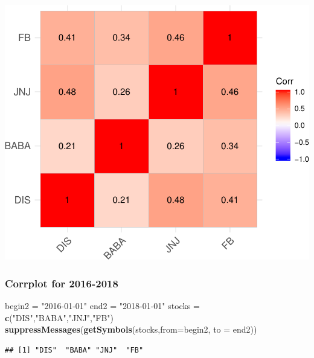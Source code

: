 \documentclass[]{article}
\newenvironment{Shaded}{\begin{snugshade}}{\end{snugshade}}
\newcommand{\KeywordTok}[1]{\textcolor[rgb]{0.13,0.29,0.53}{\textbf{#1}}}
\newcommand{\DataTypeTok}[1]{\textcolor[rgb]{0.13,0.29,0.53}{#1}}
\newcommand{\StringTok}[1]{\textcolor[rgb]{0.31,0.60,0.02}{#1}}
\newcommand{\NormalTok}[1]{#1}
\begin{document}
\includegraphics{Markowitz_Research_Me_files/figure-latex/unnamed-chunk-4-1.pdf}

\subsubsection{Corrplot for 2016-2018}\label{corrplot-for-2016-2018}

\begin{Shaded}
\begin{Highlighting}[]
\NormalTok{begin2 =}\StringTok{ "2016-01-01"}
\NormalTok{end2 =}\StringTok{ "2018-01-01"}
\NormalTok{stocks =}\StringTok{ }\KeywordTok{c}\NormalTok{(}\StringTok{"DIS"}\NormalTok{,}\StringTok{"BABA"}\NormalTok{,}\StringTok{"JNJ"}\NormalTok{,}\StringTok{"FB"}\NormalTok{)}
\KeywordTok{suppressMessages}\NormalTok{(}\KeywordTok{getSymbols}\NormalTok{(stocks,}\DataTypeTok{from=}\NormalTok{begin2, }\DataTypeTok{to =}\NormalTok{ end2))}
\end{Highlighting}
\end{Shaded}

\begin{verbatim}
## [1] "DIS"  "BABA" "JNJ"  "FB"
\end{verbatim}
\end{document}
